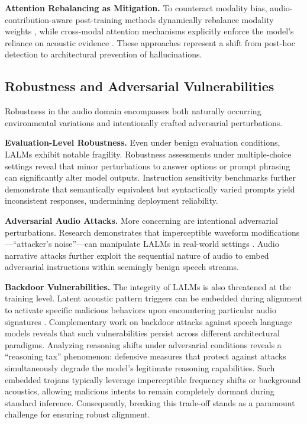 \textbf{Attention Rebalancing as Mitigation.} To counteract modality bias, audio-contribution-aware post-training methods dynamically rebalance modality weights \cite{he2025measuring}, while cross-modal attention mechanisms explicitly enforce the model's reliance on acoustic evidence \cite{wang2025pay}. These approaches represent a shift from post-hoc detection to architectural prevention of hallucinations.

\subsection{Robustness and Adversarial Vulnerabilities}
Robustness in the audio domain encompasses both naturally occurring environmental variations and intentionally crafted adversarial perturbations.

\textbf{Evaluation-Level Robustness.} Even under benign evaluation conditions, LALMs exhibit notable fragility. Robustness assessments under multiple-choice settings \cite{lopez2025robustness} reveal that minor perturbations to answer options or prompt phrasing can significantly alter model outputs. Instruction sensitivity benchmarks \cite{li2025isa} further demonstrate that semantically equivalent but syntactically varied prompts yield inconsistent responses, undermining deployment reliability.

\textbf{Adversarial Audio Attacks.} More concerning are intentional adversarial perturbations. Research demonstrates that imperceptible waveform modifications---``attacker's noise''---can manipulate LALMs in real-world settings \cite{sadasivan2025attacker}. Audio narrative attacks \cite{yu2026now} further exploit the sequential nature of audio to embed adversarial instructions within seemingly benign speech streams.

\textbf{Backdoor Vulnerabilities.} The integrity of LALMs is also threatened at the training level. Latent acoustic pattern triggers can be embedded during alignment to activate specific malicious behaviors upon encountering particular audio signatures \cite{lin2025hidden}. Complementary work on backdoor attacks against speech language models \cite{fortier2025backdoor} reveals that such vulnerabilities persist across different architectural paradigms. Analyzing reasoning shifts under adversarial conditions \cite{nguyen2026analyzing} reveals a ``reasoning tax'' phenomenon: defensive measures that protect against attacks simultaneously degrade the model's legitimate reasoning capabilities. Such embedded trojans typically leverage imperceptible frequency shifts or background acoustics, allowing malicious intents to remain completely dormant during standard inference. Consequently, breaking this trade-off stands as a paramount challenge for ensuring robust alignment.


